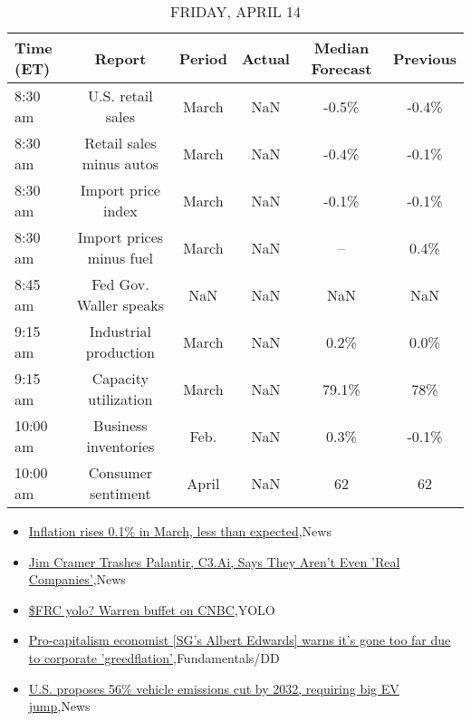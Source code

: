 \documentclass{article}%
\begin{document}
%


\begin{table}[htbp]%
\caption{FRIDAY, APRIL 14}%
\centering%
\begin{adjustbox}{width=1\textwidth}%
\begin{tabular}{lccccc}
\toprule
Time (ET) &                   Report & Period & Actual & Median Forecast & Previous \\
\midrule
  8:30 am &        U.S. retail sales &  March &    NaN &           -0.5\% &    -0.4\% \\
  8:30 am & Retail sales minus autos &  March &    NaN &           -0.4\% &    -0.1\% \\
  8:30 am &       Import price index &  March &    NaN &           -0.1\% &    -0.1\% \\
  8:30 am & Import prices minus fuel &  March &    NaN &              -- &     0.4\% \\
  8:45 am &   Fed Gov. Waller speaks &    NaN &    NaN &             NaN &      NaN \\
  9:15 am &    Industrial production &  March &    NaN &            0.2\% &     0.0\% \\
  9:15 am &     Capacity utilization &  March &    NaN &           79.1\% &      78\% \\
 10:00 am &     Business inventories &   Feb. &    NaN &            0.3\% &    -0.1\% \\
 10:00 am &       Consumer sentiment &  April &    NaN &              62 &       62 \\
\bottomrule
\end{tabular}
%
\end{adjustbox}%
\end{table}

%
\begin{itemize}%
\item%
\href{https://reddit.com/r/wallstreetbets/comments/12jkq9z/inflation\_rises\_01\_in\_march\_less\_than\_expected/}{Inflation rises 0.1\% in March, less than expected},News%
\item%
\href{https://reddit.com/r/wallstreetbets/comments/12jjiyh/jim\_cramer\_trashes\_palantir\_c3ai\_says\_they\_arent/}{Jim Cramer Trashes Palantir, C3.Ai, Says They Aren't Even 'Real Companies'},News%
\item%
\href{https://reddit.com/r/wallstreetbets/comments/12jj0uu/frc\_yolo\_warren\_buffet\_on\_cnbc/}{\$FRC yolo? Warren buffet on CNBC},YOLO%
\item%
\href{https://reddit.com/r/StockMarket/comments/12je67w/procapitalism\_economist\_sgs\_albert\_edwards\_warns/}{Pro-capitalism economist [SG's Albert Edwards] warns it's gone too far due to corporate 'greedflation'},Fundamentals/DD%
\item%
\href{https://reddit.com/r/Economics/comments/12jg2zg/us\_proposes\_56\_vehicle\_emissions\_cut\_by\_2032/}{U.S. proposes 56\% vehicle emissions cut by 2032, requiring big EV jump},News%
\end{itemize}%
\end{document}
